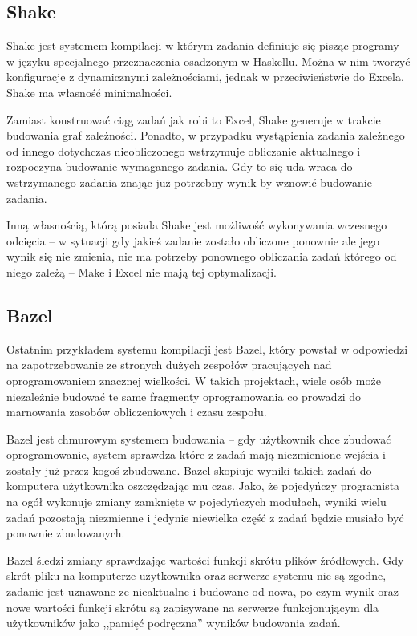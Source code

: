 \subsection{Shake}

Shake jest systemem kompilacji w którym zadania definiuje się pisząc programy w języku specjalnego przeznaczenia osadzonym w Haskellu. Można w nim tworzyć konfiguracje z dynamicznymi zależnościami, jednak w przeciwieństwie do Excela, Shake ma własność minimalności.

Zamiast konstruować ciąg zadań jak robi to Excel, Shake generuje w trakcie budowania graf zależności. Ponadto, w przypadku wystąpienia zadania zależnego od innego dotychczas nieobliczonego wstrzymuje obliczanie aktualnego i rozpoczyna budowanie wymaganego zadania. Gdy to się uda wraca do wstrzymanego zadania znając już potrzebny wynik by wznowić budowanie zadania.

Inną własnością, którą posiada Shake jest możliwość wykonywania wczesnego odcięcia -- w sytuacji gdy jakieś zadanie zostało obliczone ponownie ale jego wynik się nie zmienia, nie ma potrzeby ponownego obliczania zadań którego od niego zależą -- Make i Excel nie mają tej optymalizacji.

\subsection{Bazel}

Ostatnim przykładem systemu kompilacji jest Bazel, który powstał w odpowiedzi na zapotrzebowanie ze stronych dużych zespołów pracujących nad oprogramowaniem znacznej wielkości. W takich projektach, wiele osób może niezależnie budować te same fragmenty oprogramowania co prowadzi do marnowania zasobów obliczeniowych i czasu zespołu.

Bazel jest chmurowym systemem budowania -- gdy użytkownik chce zbudować oprogramowanie, system sprawdza które z zadań mają niezmienione wejścia i zostały już przez kogoś zbudowane. Bazel skopiuje wyniki takich zadań do komputera użytkownika oszczędzając mu czas. Jako, że pojedyńczy programista na ogół wykonuje zmiany zamknięte w pojedyńczych modułach, wyniki wielu zadań pozostają niezmienne i jedynie niewielka część z zadań będzie musiało być ponownie zbudowanych.

Bazel śledzi zmiany sprawdzając wartości funkcji skrótu plików źródłowych. Gdy skrót pliku na komputerze użytkownika oraz serwerze systemu nie są zgodne, zadanie jest uznawane ze nieaktualne i budowane od nowa, po czym wynik oraz nowe wartości funkcji skrótu są zapisywane na serwerze funkcjonującym dla użytkowników jako ,,pamięć podręczna'' wyników budowania zadań.

